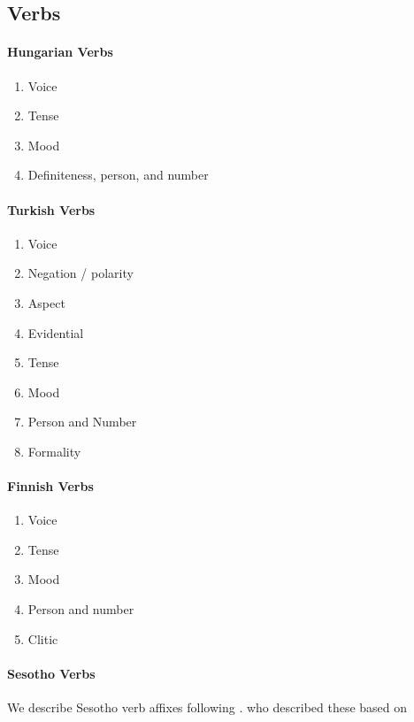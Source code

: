 \documentclass[11pt,letterpaper]{article}
\begin{document}
\subsection{Verbs}

\paragraph{Hungarian Verbs}
\begin{enumerate}
    \item Voice
    \item Tense 
    \item Mood
    \item Definiteness, person, and number
\end{enumerate}

\paragraph{Turkish Verbs}
\begin{enumerate}
    \item Voice
    \item Negation / polarity
    \item Aspect
    \item Evidential 
    \item Tense 
    \item Mood 
    \item Person and Number
    \item Formality
\end{enumerate}

\paragraph{Finnish Verbs}
\begin{enumerate}
    \item Voice
    \item Tense 
    \item Mood 
    \item Person and number
    \item Clitic
\end{enumerate}

\paragraph{Sesotho Verbs}
We describe Sesotho verb affixes following \cite{Hahn2020modeling}.
who described these based on \citep{doke1967textbook, guma1971outline, demuth1992acquisition}
\end{document}
